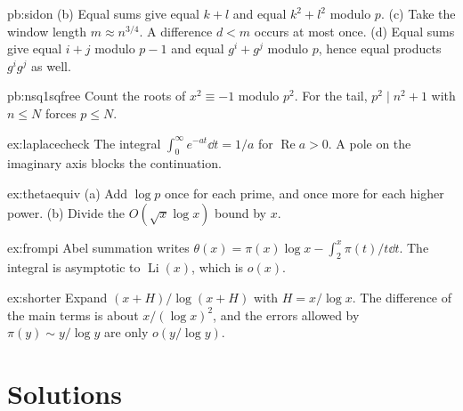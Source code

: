 \begin{hint}{pb:sidon}
(b) Equal sums give equal $k+l$ and equal $k^2+l^2$ modulo $p$. (c) Take the window length $m\approx n^{3/4}$. A difference $d<m$ occurs at most once. (d) Equal sums give equal $i+j$ modulo $p-1$ and equal $g^i+g^j$ modulo $p$, hence equal products $g^ig^j$ as well.
\end{hint}

\begin{hint}{pb:nsq1sqfree}
Count the roots of $x^2\equiv-1$ modulo $p^2$. For the tail, $p^2\mid n^2+1$ with $n\le N$ forces $p\le N$.
\end{hint}

\begin{hint}{ex:laplacecheck}
The integral $\int_0^\infty e^{-at}\dd t=1/a$ for $\operatorname{Re}a>0$. A pole on the imaginary axis blocks the continuation.
\end{hint}

\begin{hint}{ex:thetaequiv}
(a) Add $\log p$ once for each prime, and once more for each higher power. (b) Divide the $O(\sqrt x\log x)$ bound by $x$.
\end{hint}

\begin{hint}{ex:frompi}
Abel summation writes $\theta(x)=\pi(x)\log x-\int_2^x\pi(t)/t\dd t$. The integral is asymptotic to $\operatorname{Li}(x)$, which is $o(x)$.
\end{hint}

\begin{hint}{ex:shorter}
Expand $(x+H)/\log(x+H)$ with $H=x/\log x$. The difference of the main terms is about $x/(\log x)^2$, and the errors allowed by $\pi(y)\sim y/\log y$ are only $o(y/\log y)$.
\end{hint}

\section{Solutions}

